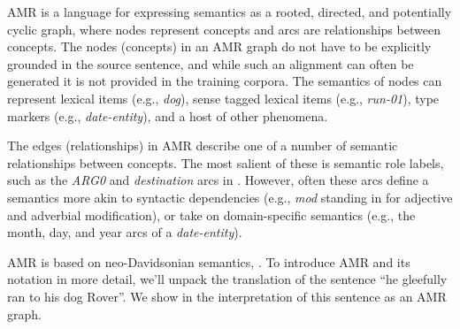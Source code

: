 \documentclass[11pt]{article}
\newcommand\w[1]{\textit{#1}} %
\begin{document}


AMR is a language for expressing semantics as a rooted, directed, and potentially cyclic graph, where nodes represent concepts and arcs are relationships between concepts.
The nodes (concepts) in an AMR graph do not have to be explicitly grounded in the source sentence, and while such an alignment can often be generated it is not provided in the training corpora.
The semantics of nodes can represent lexical items (e.g., \w{dog}), sense tagged lexical items (e.g., \textit{run-01}), type markers (e.g., \textit{date-entity}), and a host of other phenomena.

The edges (relationships) in AMR describe one of a number of semantic relationships between concepts.
The most salient of these is semantic role labels, such as the \w{ARG0} and \w{destination} arcs in .
However, often these arcs define a semantics more akin to syntactic dependencies (e.g., \textit{mod} standing in for adjective and adverbial modification), or take on domain-specific semantics (e.g., the month, day, and year arcs of a \textit{date-entity}).

AMR is based on neo-Davidsonian semantics, \cite{Davidson:1967,Parsons:1990}.
To introduce AMR and its notation in more detail, we'll unpack the translation of the sentence ``he gleefully ran to his dog Rover''. 
We show in  the interpretation of this sentence as an AMR graph.

\end{document}

